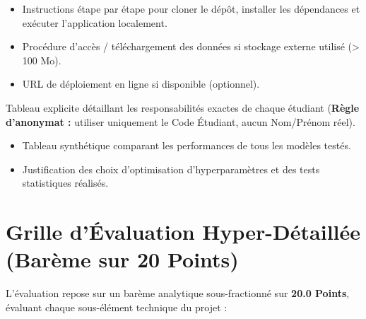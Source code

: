 \documentclass[11pt,a4paper]{article}
\begin{document}
\begin{tcolorbox}[colback=lightgray, colframe=sintefblue, title=\textbf{SECTION 2 : Guide d'Installation, Exécution Locale et Accès aux Données}, arc=2mm]
    \begin{itemize}
        \item Instructions étape par étape pour cloner le dépôt, installer les dépendances et exécuter l'application localement.
        \item Procédure d'accès / téléchargement des données si stockage externe utilisé (> 100 Mo).
        \item URL de déploiement en ligne si disponible (optionnel).
    \end{itemize}
\end{tcolorbox}

\begin{tcolorbox}[colback=lightgray, colframe=sintefblue, title=\textbf{SECTION 3 : Rôles des Membres et Matrice des Contributions}, arc=2mm]
    Tableau explicite détaillant les responsabilités exactes de chaque étudiant (\textbf{Règle d'anonymat :} utiliser uniquement le Code Étudiant, aucun Nom/Prénom réel).
\end{tcolorbox}

\begin{tcolorbox}[colback=lightgray, colframe=sintefblue, title=\textbf{SECTION 4 : Résultats Clés et Synthèse des Découvertes}, arc=2mm]
    \begin{itemize}
        \item Tableau synthétique comparant les performances de tous les modèles testés.
        \item Justification des choix d'optimisation d'hyperparamètres et des tests statistiques réalisés.
    \end{itemize}
\end{tcolorbox}

\section{Grille d'Évaluation Hyper-Détaillée (Barème sur 20 Points)}

L'évaluation repose sur un barème analytique sous-fractionné sur \textbf{20.0 Points}, évaluant chaque sous-élément technique du projet :
\end{document}
